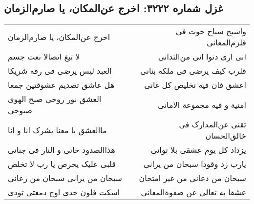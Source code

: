 \begin{center}
\section*{غزل شماره ۳۲۲۲: اخرج عن‌المکان، یا صارم‌الزمان}
\label{sec:3222}
\begin{longtable}{l p{0.5cm} r}
اخرج عن‌المکان، یا صارم‌الزمان
&&
واسبح سباح حوت فی قلزم‌المعانی
\\
لا تبغ اتصالا نعت جسم
&&
انی اری دنوا انی من‌التدانی
\\
العبد لیس یرضی فی رقه شریکا
&&
فلرب کیف یرضی فی ملکه بثانی
\\
هل عاشق تصدیم عشوقتین جمعا
&&
اعشق فان فیه تخلیص کل غانی
\\
العشق نور روحی صبح الهوی صبوحی
&&
امنیة و فیه مجموعة الامانی
\\
ماالعشق یا معنا یشرک انا و انا
&&
تقنی عن‌المدارک فی خالق‌الحسان
\\
هذاالصدود خانی و النار فی جنانی
&&
یزداد کل یوم عشقی بلا توانی
\\
قلبی علیک یحرص یا رب لا تخلص
&&
یارب زد وقودا سبحان من یرانی
\\
سبحان من یرانی سبحان من رعانی
&&
سبحان من دعانی من غیر امتحان
\\
اسکت فلون خدی اوج دمعتی تودی
&&
عشقا به تعالی عن صفوةالمعانی
\\
\end{longtable}
\end{center}
